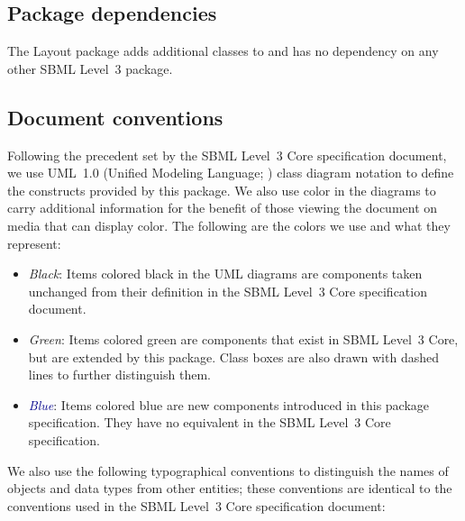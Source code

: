 \subsection{Package dependencies}

The Layout package adds additional classes to \sbmlthreecore and has no dependency on any other SBML Level~3 package.


\subsection{Document conventions}

\label{conventions}

Following the precedent set by the SBML Level~3 Core specification
document, we use UML~1.0 (Unified Modeling Language;
\citealt{eriksson:1998,oestereich:1999}) class diagram notation to
define the constructs provided by this package.  We also use color in
the diagrams to carry additional information for the benefit of those
viewing the document on media that can display color.  The following are
the colors we use and what they represent:

\begin{itemize}

\item[\raisebox{2.75pt}{\colorbox{black}{\rule{0.8pt}{0.8pt}}}]
  \emph{Black}: Items colored black in the UML diagrams are components
  taken unchanged from their definition in the SBML Level~3 Core
  specification document.

\item[\raisebox{2.75pt}{\colorbox{mediumgreen}{\rule{0.8pt}{0.8pt}}}]
  \emph{\textcolor{mediumgreen}{Green}}: Items colored green are
  components that exist in SBML Level~3 Core, but are extended by this
  package.  Class boxes are also drawn with dashed lines to further
  distinguish them.

\item[\raisebox{2.75pt}{\colorbox{darkblue}{\rule{0.8pt}{0.8pt}}}]
  \emph{\textcolor{darkblue}{Blue}}: Items colored blue are new
  components introduced in this package specification.  They have no
  equivalent in the SBML Level~3 Core specification.

\end{itemize}

We also use the following typographical conventions to distinguish the
names of objects and data types from other entities; these conventions
are identical to the conventions used in the SBML Level~3 Core specification
document:


